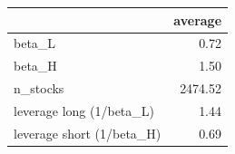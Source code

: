 \begin{tabular}{lr}
\toprule
 & average \\
\midrule
beta\_L & 0.72 \\
beta\_H & 1.50 \\
n\_stocks & 2474.52 \\
leverage long (1/beta\_L) & 1.44 \\
leverage short (1/beta\_H) & 0.69 \\
\bottomrule
\end{tabular}
